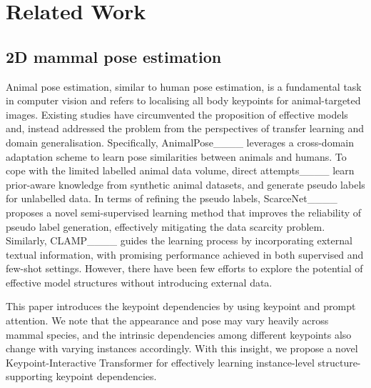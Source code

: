 \section{Related Work}
\label{sec_2}
\subsection{2D mammal pose estimation}
\label{subsec:rel_pe}
Animal pose estimation, similar to human pose estimation, is a fundamental task in computer vision and refers to localising all body keypoints for animal-targeted images.
Existing studies have circumvented the proposition of effective models and, instead addressed the problem from the perspectives of transfer learning and domain generalisation.
Specifically, AnimalPose____ leverages a cross-domain adaptation scheme to learn pose similarities between animals and humans.
To cope with the limited labelled animal data volume, direct attempts____ learn prior-aware knowledge from synthetic animal datasets, and generate pseudo labels for unlabelled data.
In terms of refining the pseudo labels, ScarceNet____ proposes a novel semi-supervised learning method that improves the reliability of pseudo label generation, effectively mitigating the data scarcity problem.
Similarly, CLAMP____ guides the learning process by incorporating external textual information, with promising performance achieved in both supervised and few-shot settings.
However, there have been few efforts to explore the potential of effective model structures without introducing external data.

This paper introduces the keypoint dependencies by using keypoint and prompt attention.
We note that the appearance and pose may vary heavily across mammal species, and the intrinsic dependencies among different keypoints also change with varying instances accordingly.
With this insight, we propose a novel Keypoint-Interactive Transformer for effectively learning instance-level structure-supporting keypoint dependencies.

